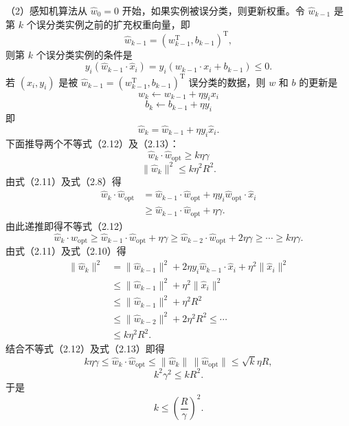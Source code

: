 \documentclass[UTF8, 12pt, fontset=fandol, oneside]{ctexart}
\begin{document}
（2）感知机算法从 $\hat{w}_0=0$ 开始，如果实例被误分类，则更新权重。令 $\hat{w}_{k-1}$ 是第 $k$ 个误分类实例之前的扩充权重向量，即
\[
  \hat{w}_{k-1}=(w_{k-1}^\mathrm{T},b_{k-1})^\mathrm{T},
\]
则第 $k$ 个误分类实例的条件是
\begin{equation}
  y_i(\hat{w}_{k-1}\cdot\hat{x}_i)=y_i(w_{k-1}\cdot x_i+b_{k-1})\le 0.
  \tag{2.10}
\end{equation}
若 $(x_i,y_i)$ 是被 $\hat{w}_{k-1}=(w_{k-1}^\mathrm{T},b_{k-1})^\mathrm{T}$ 误分类的数据，则 $w$ 和 $b$ 的更新是
\[
  w_k\leftarrow w_{k-1}+\eta y_ix_i
\]
\[
  b_k\leftarrow b_{k-1}+\eta y_i
\]
即
\begin{equation}
  \hat{w}_k=\hat{w}_{k-1}+\eta y_i\hat{x}_i.
  \tag{2.11}
\end{equation}
下面推导两个不等式（2.12）及（2.13）：
\begin{equation}
  \hat{w}_k\cdot\hat{w}_{\mathrm{opt}}\ge k\eta\gamma
  \tag{2.12}
\end{equation}
\begin{equation}
  \|\hat{w}_k\|^2\le k\eta^2R^2.
  \tag{2.13}
\end{equation}
由式（2.11）及式（2.8）得
\[
\begin{aligned}
  \hat{w}_k\cdot\hat{w}_{\mathrm{opt}}
  &=\hat{w}_{k-1}\cdot\hat{w}_{\mathrm{opt}}
    +\eta y_i\hat{w}_{\mathrm{opt}}\cdot\hat{x}_i\\
  &\ge \hat{w}_{k-1}\cdot\hat{w}_{\mathrm{opt}}+\eta\gamma.
\end{aligned}
\]
由此递推即得不等式（2.12）
\[
  \hat{w}_k\cdot\hat{w}_{\mathrm{opt}}
  \ge \hat{w}_{k-1}\cdot\hat{w}_{\mathrm{opt}}+\eta\gamma
  \ge \hat{w}_{k-2}\cdot\hat{w}_{\mathrm{opt}}+2\eta\gamma
  \ge\cdots\ge k\eta\gamma.
\]
由式（2.11）及式（2.10）得
\[
\begin{aligned}
  \|\hat{w}_k\|^2
  &=\|\hat{w}_{k-1}\|^2+2\eta y_i\hat{w}_{k-1}\cdot\hat{x}_i
    +\eta^2\|\hat{x}_i\|^2\\
  &\le \|\hat{w}_{k-1}\|^2+\eta^2\|\hat{x}_i\|^2\\
  &\le \|\hat{w}_{k-1}\|^2+\eta^2R^2\\
  &\le \|\hat{w}_{k-2}\|^2+2\eta^2R^2\le\cdots\\
  &\le k\eta^2R^2.
\end{aligned}
\]
结合不等式（2.12）及式（2.13）即得
\[
  k\eta\gamma\le \hat{w}_k\cdot\hat{w}_{\mathrm{opt}}
  \le \|\hat{w}_k\|\,\|\hat{w}_{\mathrm{opt}}\|
  \le \sqrt{k}\eta R,
\]
\[
  k^2\gamma^2\le kR^2.
\]
于是
\[
  k\le\left(\frac{R}{\gamma}\right)^2.
\]
\end{document}
